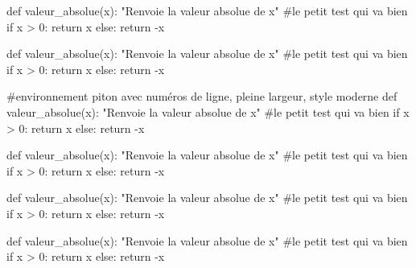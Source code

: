 \documentclass[french,a4paper,10pt]{article}
\begin{document}
\pagebreak

{\small \begin{codehigh}
\begin{CodePiton}[Style=Moderne,Largeur=10cm,BarreTitre=false,Alignement=center]{}
def valeur_absolue(x):
    "Renvoie la valeur absolue de x"
    #le petit test qui va bien
    if x > 0:
        return x
    else:
    return -x
\end{CodePiton}
\end{codehigh}}

\begin{CodePiton}[Style=Moderne,Largeur=10cm,BarreTitre=false,Alignement=center]{}
def valeur_absolue(x):
	"Renvoie la valeur absolue de x"
	#le petit test qui va bien
	if x > 0:
		return x
	else:
		return -x
\end{CodePiton}

{\small \begin{codehigh}
\begin{CodePiton}%
    [Largeur=0.5\linewidth,Cadre=false,Alignement=flush right,Filigrane,Titre={Script}]{}
#environnement piton avec numéros de ligne, pleine largeur, style moderne
def valeur_absolue(x):
    "Renvoie la valeur absolue de x"
    #le petit test qui va bien
    if x > 0:
        return x
    else:
    return -x
\end{CodePiton}
\end{codehigh}}

\begin{CodePiton}[Largeur=0.5\linewidth,Cadre=false,Alignement=flush right,Filigrane,Titre={Script}]{}
def valeur_absolue(x):
	"Renvoie la valeur absolue de x"
	#le petit test qui va bien
	if x > 0:
		return x
	else:
		return -x
\end{CodePiton}

{\small \begin{codehigh}
\begin{CodePiton}[Style=Moderne,Largeur=11cm,Filigrane,Alignement=flush left,Lignes=false]{}
def valeur_absolue(x):
    "Renvoie la valeur absolue de x"
    #le petit test qui va bien
    if x > 0:
        return x
    else:
    return -x
\end{CodePiton}
\end{codehigh}}

\begin{CodePiton}[Style=Moderne,Largeur=11cm,Filigrane,Alignement=flush left,Lignes=false]{}
def valeur_absolue(x):
	"Renvoie la valeur absolue de x"
	#le petit test qui va bien
	if x > 0:
		return x
	else:
		return -x
\end{CodePiton}
\end{document}
